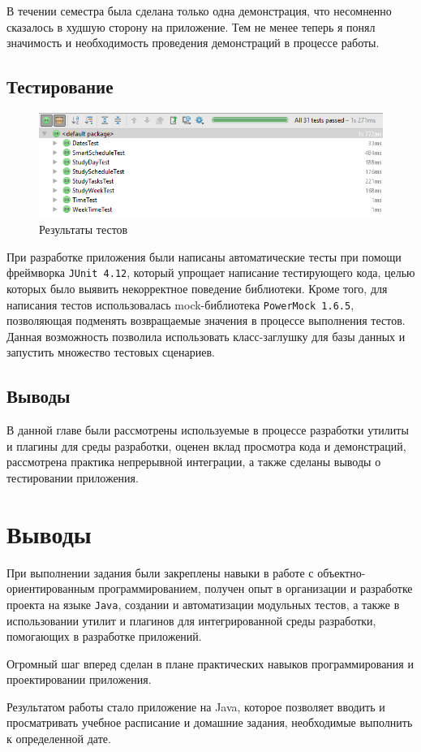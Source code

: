 В течении семестра была сделана только одна демонстрация, что несомненно сказалось в худшую сторону на приложение. Тем не менее теперь я понял значимость и необходимость проведения демонстраций в процессе работы.

\subsection{Тестирование}

\begin{figure}[H]
	\begin{center}
		\includegraphics[scale=0.7]{pics/tests}
		\caption{Результаты тестов} 
		\label{pic:tests} %
	\end{center}
\end{figure}

При разработке приложения были написаны автоматические тесты при помощи фреймворка \texttt{JUnit~4.12}, который упрощает написание тестирующего кода, целью которых было выявить некорректное поведение библиотеки. Кроме того, для написания тестов использовалась mock-библиотека \texttt{PowerMock 1.6.5}, позволяющая подменять возвращаемые значения в процессе выполнения тестов. Данная возможность позволила использовать класс-заглушку для базы данных и запустить множество тестовых сценариев.

\subsection{Выводы}

В данной главе были рассмотрены используемые в процессе разработки утилиты и плагины для среды разработки, оценен вклад просмотра кода и демонстраций, рассмотрена практика непрерывной интеграции, а также сделаны выводы о тестировании приложения.

\section{Выводы}

При выполнении задания были закреплены навыки в работе с объектно-ориентированным программированием, получен опыт в организации и разработке проекта на языке \texttt{Java}, создании и автоматизации модульных тестов, а также в использовании утилит и плагинов для интегрированной среды разработки, помогающих в разработке приложений.

Огромный шаг вперед сделан в плане практических навыков программирования и проектировании приложения.

Результатом работы стало приложение на Java, которое позволяет вводить и просматривать учебное расписание и домашние задания, необходимые выполнить к определенной дате.



